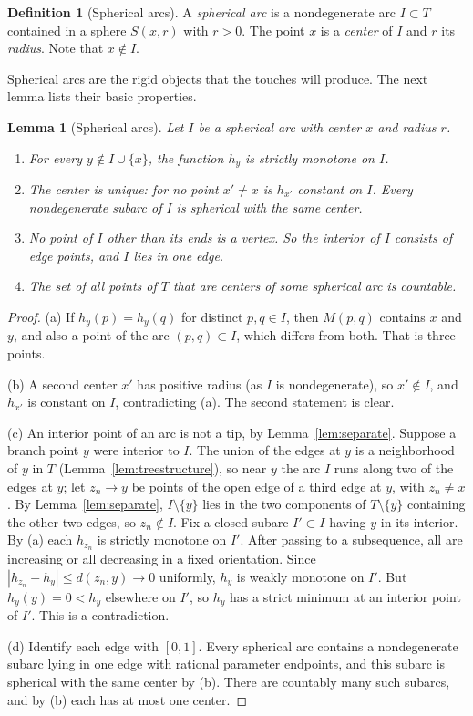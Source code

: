 \documentclass[11pt]{amsart}
\newtheorem{lemma}[theorem]{Lemma}
\theoremstyle{definition}
\newtheorem{definition}[theorem]{Definition}
\theoremstyle{remark}
\newcommand{\M}{M}
\begin{document}
\begin{definition}[Spherical arcs]\label{def:spherical}
A \emph{spherical arc} is a nondegenerate arc $I\subset T$ contained in a sphere $S(x,r)$ with $r>0$. The point $x$ is a \emph{center} of $I$ and $r$ its \emph{radius}. Note that $x\notin I$.
\end{definition}

Spherical arcs are the rigid objects that the touches will produce. The next lemma lists their basic properties.

\begin{lemma}[Spherical arcs]\label{lem:sphericalarc}
Let $I$ be a spherical arc with center $x$ and radius $r$.
\begin{enumerate}[label=\textup{(\alph*)}]
\item For every $y\notin I\cup\{x\}$, the function $h_y$ is strictly monotone on $I$.
\item The center is unique: for no point $x'\ne x$ is $h_{x'}$ constant on $I$. Every nondegenerate subarc of $I$ is spherical with the same center.
\item No point of $I$ other than its ends is a vertex. So the interior of $I$ consists of edge points, and $I$ lies in one edge.
\item The set of all points of $T$ that are centers of some spherical arc is countable.
\end{enumerate}
\end{lemma}
\begin{proof}
(a) If $h_y(p)=h_y(q)$ for distinct $p,q\in I$, then $\M(p,q)$ contains $x$ and $y$, and also a point of the arc $(p,q)\subset I$, which differs from both. That is three points.

(b) A second center $x'$ has positive radius (as $I$ is nondegenerate), so $x'\notin I$, and $h_{x'}$ is constant on $I$, contradicting (a). The second statement is clear.

(c) An interior point of an arc is not a tip, by Lemma~\ref{lem:separate}. Suppose a branch point $y$ were interior to $I$. The union of the edges at $y$ is a neighborhood of $y$ in $T$ (Lemma~\ref{lem:treestructure}), so near $y$ the arc $I$ runs along two of the edges at $y$; let $z_n\to y$ be points of the open edge of a third edge at $y$, with $z_n\ne x$. By Lemma~\ref{lem:separate}, $I\setminus\{y\}$ lies in the two components of $T\setminus\{y\}$ containing the other two edges, so $z_n\notin I$. Fix a closed subarc $I'\subset I$ having $y$ in its interior. By (a) each $h_{z_n}$ is strictly monotone on $I'$. After passing to a subsequence, all are increasing or all decreasing in a fixed orientation. Since $|h_{z_n}-h_y|\le d(z_n,y)\to0$ uniformly, $h_y$ is weakly monotone on $I'$. But $h_y(y)=0<h_y$ elsewhere on $I'$, so $h_y$ has a strict minimum at an interior point of $I'$. This is a contradiction.

(d) Identify each edge with $[0,1]$. Every spherical arc contains a nondegenerate subarc lying in one edge with rational parameter endpoints, and this subarc is spherical with the same center by (b). There are countably many such subarcs, and by (b) each has at most one center.
\end{proof}
\end{document}
